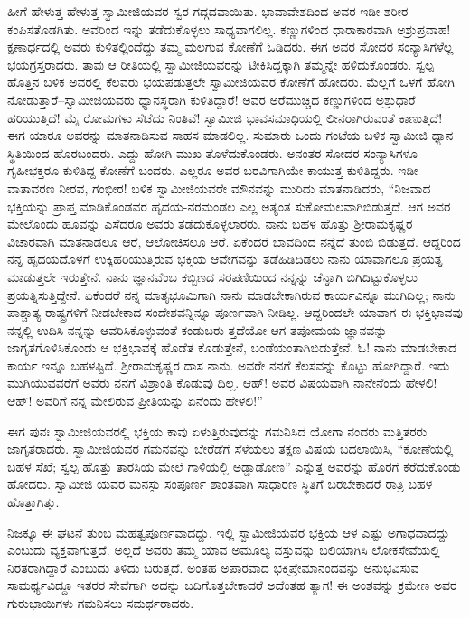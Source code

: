 ಹೀಗೆ ಹೇಳುತ್ತ ಹೇಳುತ್ತ ಸ್ವಾಮೀಜಿಯವರ ಸ್ವರ ಗದ್ಗದವಾಯಿತು. ಭಾವಾವೇಶದಿಂದ ಅವರ ಇಡೀ ಶರೀರ ಕಂಪಿಸತೊಡಗಿತು. ಅವರಿಂದ ಇನ್ನು ತಡೆದುಕೊಳ್ಳಲು ಸಾಧ್ಯವಾಗಲಿಲ್ಲ. ಕಣ್ಣುಗಳಿಂದ ಧಾರಾಕಾರವಾಗಿ ಅಶ್ರುಪ್ರವಾಹ! ಕ್ಷಣಾರ್ಧದಲ್ಲಿ ಅವರು ಕುಳಿತಲ್ಲಿಂದೆದ್ದು ತಮ್ಮ ಮಲಗುವ ಕೋಣೆಗೆ ಓಡಿದರು. ಈಗ ಅವರ ಸೋದರ ಸಂನ್ಯಾಸಿಗಳೆಲ್ಲ ಭಯಗ್ರಸ್ತರಾದರು. ತಾವು ಆ ರೀತಿಯಲ್ಲಿ ಸ್ವಾಮೀಜಿಯವರನ್ನು ಟೀಕಿಸಿದ್ದಕ್ಕಾಗಿ ತಮ್ಮನ್ನೇ ಹಳಿದುಕೊಂಡರು. ಸ್ವಲ್ಪ ಹೊತ್ತಿನ ಬಳಿಕ ಅವರಲ್ಲಿ ಕೆಲವರು ಭಯಪಡುತ್ತಲೇ ಸ್ವಾಮೀಜಿಯವರ ಕೋಣೆಗೆ ಹೋದರು. ಮೆಲ್ಲಗೆ ಒಳಗೆ ಹೋಗಿ ನೋಡುತ್ತಾರೆ–ಸ್ವಾಮೀಜಿಯವರು ಧ್ಯಾನಸ್ಥರಾಗಿ ಕುಳಿತಿದ್ದಾರೆ! ಅವರ ಅರೆಮುಚ್ಚಿದ ಕಣ್ಣುಗಳಿಂದ ಅಶ್ರುಧಾರೆ ಹರಿಯುತ್ತಿದೆ! ಮೈ ರೋಮಗಳು ಸೆಟೆದು ನಿಂತಿವೆ! ಸ್ವಾಮೀಜಿ ಭಾವಸಮಾಧಿಯಲ್ಲಿ ಲೀನರಾಗಿರುವಂತೆ ಕಾಣುತ್ತಿದೆ! ಈಗ ಯಾರೂ ಅವರನ್ನು ಮಾತನಾಡಿಸುವ ಸಾಹಸ ಮಾಡಲಿಲ್ಲ. ಸುಮಾರು ಒಂದು ಗಂಟೆಯ ಬಳಿಕ ಸ್ವಾಮೀಜಿ ಧ್ಯಾನ ಸ್ಥಿತಿಯಿಂದ ಹೊರಬಂದರು. ಎದ್ದು ಹೋಗಿ ಮುಖ ತೊಳೆದುಕೊಂಡರು. ಅನಂತರ ಸೋದರ ಸಂನ್ಯಾಸಿಗಳೂ ಗೃಹೀಭಕ್ತರೂ ಕುಳಿತಿದ್ದ ಕೋಣೆಗೆ ಬಂದರು. ಎಲ್ಲರೂ ಅವರ ಬರವಿಗಾಗಿಯೇ ಕಾಯುತ್ತ ಕುಳಿತಿದ್ದರು. ಇಡೀ ವಾತಾವರಣ ನೀರವ, ಗಂಭೀರ! ಬಳಿಕ ಸ್ವಾಮೀಜಿಯವರೇ ಮೌನವನ್ನು ಮುರಿದು ಮಾತನಾಡಿದರು, “ನಿಜವಾದ ಭಕ್ತಿಯನ್ನು ಪ್ರಾಪ್ತ ಮಾಡಿಕೊಂಡವರ ಹೃದಯ-ನರಮಂಡಲ ಎಲ್ಲ ಅತ್ಯಂತ ಸುಕೋಮಲವಾಗಿಬಿಡುತ್ತದೆ. ಆಗ ಅವರ ಮೇಲೊಂದು ಹೂವನ್ನು ಎಸೆದರೂ ಅವರು ತಡೆದುಕೊಳ್ಳಲಾರರು. ನಾನು ಬಹಳ ಹೊತ್ತು ಶ್ರೀರಾಮಕೃಷ್ಣರ ವಿಚಾರವಾಗಿ ಮಾತನಾಡಲೂ ಆರೆ, ಆಲೋಚಿಸಲೂ ಆರೆ. ಏಕೆಂದರೆ ಭಾವದಿಂದ ನನ್ನೆದೆ ತುಂಬಿ ಬಿಡುತ್ತದೆ. ಆದ್ದರಿಂದ ನನ್ನ ಹೃದಯದೊಳಗೆ ಉಕ್ಕಿಹರಿಯುತ್ತಿರುವ ಭಕ್ತಿಯ ಆವೇಗವನ್ನು ತಡೆಹಿಡಿದಿಡಲು ನಾನು ಯಾವಾಗಲೂ ಪ್ರಯತ್ನ ಮಾಡುತ್ತಲೇ ಇರುತ್ತೇನೆ. ನಾನು ಜ್ಞಾನವೆಂಬ ಕಬ್ಬಿಣದ ಸರಪಣಿಯಿಂದ ನನ್ನನ್ನು ಚೆನ್ನಾಗಿ ಬಿಗಿದಿಟ್ಟುಕೊಳ್ಳಲು ಪ್ರಯತ್ನಿಸುತ್ತಿದ್ದೇನೆ. ಏಕೆಂದರೆ ನನ್ನ ಮಾತೃಭೂಮಿಗಾಗಿ ನಾನು ಮಾಡಬೇಕಾಗಿರುವ ಕಾರ್ಯವಿನ್ನೂ ಮುಗಿದಿಲ್ಲ; ನಾನು ಪಾಶ್ಚಾತ್ಯ ರಾಷ್ಟ್ರಗಳಿಗೆ ನೀಡಬೇಕಾದ ಸಂದೇಶವನ್ನಿನ್ನೂ ಪೂರ್ಣವಾಗಿ ನೀಡಿಲ್ಲ. ಆದ್ದರಿಂದಲೇ ಯಾವಾಗ ಈ ಭಕ್ತಿಭಾವವು ನನ್ನಲ್ಲಿ ಉದಿಸಿ ನನ್ನನ್ನು ಆವರಿಸಿಕೊಳ್ಳುವಂತೆ ಕಂಡುಬರು ತ್ತದೆಯೋ ಆಗ ತಪೋಮಯ ಜ್ಞಾನವನ್ನು ಜಾಗೃತಗೊಳಿಸಿಕೊಂಡು ಆ ಭಕ್ತಿಭಾವಕ್ಕೆ ಹೊಡೆತ ಕೊಡುತ್ತೇನೆ, ಬಂಡೆಯಂತಾಗಿಬಿಡುತ್ತೇನೆ. ಓ! ನಾನು ಮಾಡಬೇಕಾದ ಕಾರ್ಯ ಇನ್ನೂ ಬಹಳಷ್ಟಿದೆ. ಶ್ರೀರಾಮಕೃಷ್ಣರ ದಾಸ ನಾನು. ಅವರೇ ನನಗೆ ಕೆಲಸವನ್ನು ಕೊಟ್ಟು ಹೋಗಿದ್ದಾರೆ. ಇದು ಮುಗಿಯುವವರೆಗೆ ಅವರು ನನಗೆ ವಿಶ್ರಾಂತಿ ಕೊಡುವು ದಿಲ್ಲ. ಆಹ್! ಅವರ ವಿಷಯವಾಗಿ ನಾನೇನೆಂದು ಹೇಳಲಿ! ಆಹ್! ಅವರಿಗೆ ನನ್ನ ಮೇಲಿರುವ ಪ್ರೀತಿಯನ್ನು ಏನೆಂದು ಹೇಳಲಿ!”

ಈಗ ಪುನಃ ಸ್ವಾಮೀಜಿಯವರಲ್ಲಿ ಭಕ್ತಿಯ ಕಾವು ಏಳುತ್ತಿರುವುದನ್ನು ಗಮನಿಸಿದ ಯೋಗಾ ನಂದರು ಮತ್ತಿತರರು ಜಾಗೃತರಾದರು. ಸ್ವಾಮೀಜಿಯವರ ಗಮನವನ್ನು ಬೇರೆಡೆಗೆ ಸೆಳೆಯಲು ತಕ್ಷಣ ವಿಷಯ ಬದಲಾಯಿಸಿ, “ಕೋಣೆಯಲ್ಲಿ ಬಹಳ ಸೆಖೆ; ಸ್ವಲ್ಪ ಹೊತ್ತು ತಾರಸಿಯ ಮೇಲೆ ಗಾಳಿಯಲ್ಲಿ ಅಡ್ಡಾಡೋಣ” ಎನ್ನುತ್ತ ಅವರನ್ನು ಹೊರಗೆ ಕರೆದುಕೊಂಡು ಹೋದರು. ಸ್ವಾಮೀಜಿ ಯವರ ಮನಸ್ಸು ಸಂಪೂರ್ಣ ಶಾಂತವಾಗಿ ಸಾಧಾರಣ ಸ್ಥಿತಿಗೆ ಬರಬೇಕಾದರೆ ರಾತ್ರಿ ಬಹಳ ಹೊತ್ತಾಗಿತ್ತು.

ನಿಜಕ್ಕೂ ಈ ಘಟನೆ ತುಂಬ ಮಹತ್ವಪೂರ್ಣವಾದದ್ದು. ಇಲ್ಲಿ ಸ್ವಾಮೀಜಿಯವರ ಭಕ್ತಿಯ ಆಳ ಎಷ್ಟು ಅಗಾಧವಾದದ್ದು ಎಂಬುದು ವ್ಯಕ್ತವಾಗುತ್ತದೆ. ಅಲ್ಲದೆ ಅವರು ತಮ್ಮ ಯಾವ ಅಮೂಲ್ಯ ವಸ್ತುವನ್ನು ಬಲಿಯಾಗಿಸಿ ಲೋಕಸೇವೆಯಲ್ಲಿ ನಿರತರಾಗಿದ್ದಾರೆ ಎಂಬುದು ತಿಳಿದು ಬರುತ್ತದೆ. ಅಂತಹ ಅಪಾರವಾದ ಭಕ್ತಿಪ್ರೇಮಾನಂದವನ್ನು ಅನುಭವಿಸುವ ಸಾಮರ್ಥ್ಯವಿದ್ದೂ ಇತರರ ಸೇವೆಗಾಗಿ ಅದನ್ನು ಬದಿಗೊತ್ತಬೇಕಾದರೆ ಅದೆಂತಹ ತ್ಯಾಗ! ಈ ಅಂಶವನ್ನು ಕ್ರಮೇಣ ಅವರ ಗುರುಭಾಯಿಗಳು ಗಮನಿಸಲು ಸಮರ್ಥರಾದರು.


